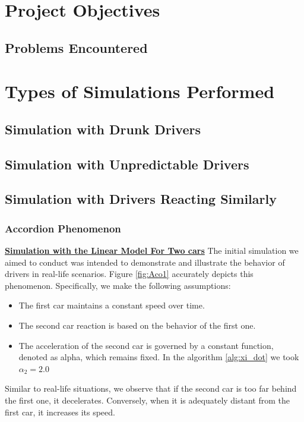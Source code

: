 \documentclass{article}
\begin{document}
	\section{Project Objectives}
	\subsection{Problems Encountered}
	
	\section{Types of Simulations Performed}
		\subsection{Simulation with Drunk Drivers}
		\subsection{Simulation with Unpredictable Drivers}
		\subsection{Simulation with Drivers Reacting Similarly}
		\subsubsection{Accordion Phenomenon}
		
		\textbf{\underline{Simulation with the Linear Model For Two cars}} \newline\newline
		The initial simulation we aimed to conduct was intended to demonstrate and illustrate the behavior of drivers in real-life scenarios. Figure \ref{fig:Aco1} accurately depicts this phenomenon. Specifically, we make the following assumptions:
		
		\begin{itemize}
			\item The first car maintains a constant speed over time.
			\item The second car reaction is based on the behavior of the first one.
			\item The acceleration of the second car is governed by a constant function, denoted as alpha, which remains fixed. In the algorithm \ref{alg:xi_dot} we took $\alpha_2=2.0$
		\end{itemize}
		
		Similar to real-life situations, we observe that if the second car is too far behind the first one, it decelerates. Conversely, when it is adequately distant from the first car, it increases its speed.
		
\end{document}
